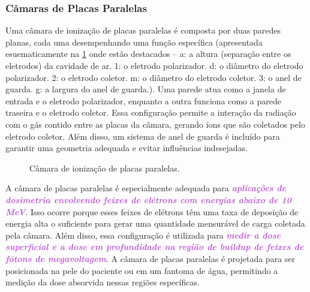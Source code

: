 \documentclass[11pt,a4paper]{article}
\begin{document}
\subsubsection*{Câmaras de Placas Paralelas}


	Uma câmara de ionização de placas paralelas é composta por duas paredes planas, cada uma desempenhando uma função específica (apresentada esuematicamente na \ref{fig:camaraPp} onde estão destacados -- a: a altura (separação entre os eletrodos) da cavidade de ar. 1: o eletrodo polarizador. d: o diâmetro do eletrodo polarizador. 2: o eletrodo coletor. m: o diâmetro do eletrodo coletor. 3: o anel de guarda. g: a largura do anel de guarda.). Uma parede atua como a janela de entrada e o eletrodo polarizador, enquanto a outra funciona como a parede traseira e o eletrodo coletor. Essa configuração permite a interação da radiação com o gás contido entre as placas da câmara, gerando íons que são coletados pelo eletrodo coletor. Além disso, um sistema de anel de guarda é incluído para garantir uma geometria adequada e evitar influências indesejadas.

	\begin{figure}
		\centering
		\caption{Câmara de ionização de placas paralelas.}
		\label{fig:camaraPp}
	\end{figure}
	
	A câmara de placas paralelas é especialmente adequada para \textcolor{MediumOrchid}{\textit{\textbf{aplicações de dosimetria envolvendo feixes de elétrons com energias abaixo de 10 MeV}}}. Isso ocorre porque esses feixes de elétrons têm uma taxa de deposição de energia alta o suficiente para gerar uma quantidade mensurável de carga coletada pela câmara. Além disso, essa configuração é utilizada para \textcolor{MediumOrchid}{\textit{\textbf{medir a dose superficial e a dose em profundidade na região de buildup de feixes de fótons de megavoltagem}}}. A câmara de placas paralelas é projetada para ser posicionada na pele do paciente ou em um fantoma de água, permitindo a medição da dose absorvida nessas regiões específicas.
\end{document}
